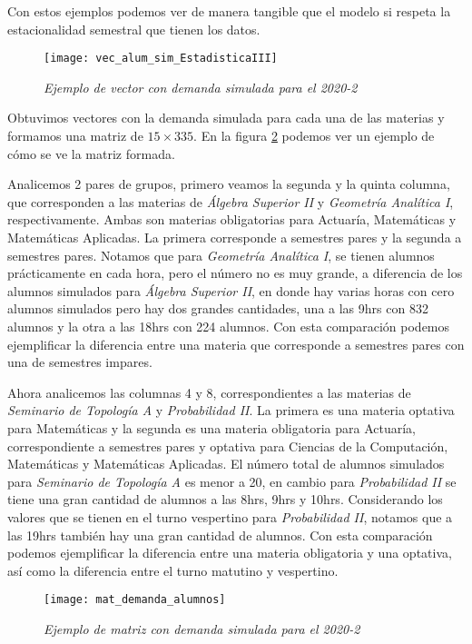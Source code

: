 Con estos ejemplos podemos ver de manera tangible que el modelo si respeta la estacionalidad semestral que tienen los datos.

\begin{figure}[H]
\centering
\texttt{[image: vec\_alum\_sim\_EstadisticaIII]} %
\caption{\textit{Ejemplo de vector con demanda simulada para el 2020-2}}\label{vec_alum_sim}
\end{figure}

Obtuvimos vectores con la demanda simulada para cada una de las materias y formamos una matriz de $15 \times 335$. En la figura \ref{matDemandaAlum} podemos ver un ejemplo de cómo se ve la matriz formada.

Analicemos 2 pares de grupos, primero veamos la segunda y la quinta columna, que corresponden a las materias de \textit{Álgebra Superior II} y \textit{Geometría Analítica I}, respectivamente. Ambas son materias obligatorias para Actuaría, Matemáticas y Matemáticas Aplicadas. La primera corresponde a semestres pares y la segunda a semestres pares. Notamos que para \textit{Geometría Analítica I}, se tienen alumnos prácticamente en cada hora, pero el número no es muy grande, a diferencia de los alumnos simulados para \textit{Álgebra Superior II}, en donde hay varias horas con cero alumnos simulados pero hay dos grandes cantidades, una a las 9hrs con 832 alumnos y la otra a las 18hrs con 224 alumnos. Con esta comparación podemos ejemplificar la diferencia entre una materia que corresponde a semestres pares con una de semestres impares.

Ahora analicemos las columnas 4 y 8, correspondientes a las materias de \textit{Seminario de Topología A} y \textit{Probabilidad II}. La primera es una materia optativa para Matemáticas y la segunda es una materia obligatoria para Actuaría, correspondiente a semestres pares y optativa para Ciencias de la Computación, Matemáticas y Matemáticas Aplicadas. El número total de alumnos simulados para \textit{Seminario de Topología A} es menor a 20, en cambio para \textit{Probabilidad II} se tiene una gran cantidad de alumnos a las 8hrs, 9hrs y 10hrs. Considerando los valores que se tienen en el turno vespertino para \textit{Probabilidad II}, notamos que a las 19hrs también hay una gran cantidad de alumnos. Con esta comparación podemos ejemplificar la diferencia entre una materia obligatoria y una optativa, así como la diferencia entre el turno matutino y vespertino.


\begin{figure}[H]
\centering
\texttt{[image: mat\_demanda\_alumnos]} %
\caption{\textit{Ejemplo de matriz con demanda simulada para el 2020-2}}\label{matDemandaAlum}
\end{figure}
